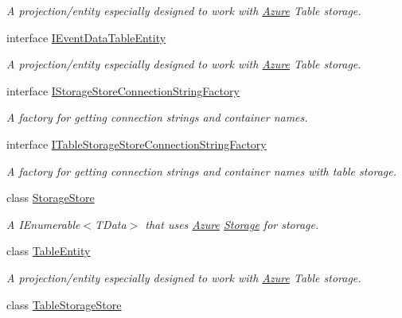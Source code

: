\begin{DoxyCompactItemize}
\begin{DoxyCompactList}\small\item\em A projection/entity especially designed to work with \hyperlink{namespaceCqrs_1_1Azure}{Azure} Table storage. \end{DoxyCompactList}\item 
interface \hyperlink{interfaceCqrs_1_1Azure_1_1BlobStorage_1_1IEventDataTableEntity}{I\+Event\+Data\+Table\+Entity}
\begin{DoxyCompactList}\small\item\em A projection/entity especially designed to work with \hyperlink{namespaceCqrs_1_1Azure}{Azure} Table storage. \end{DoxyCompactList}\item 
interface \hyperlink{interfaceCqrs_1_1Azure_1_1BlobStorage_1_1IStorageStoreConnectionStringFactory}{I\+Storage\+Store\+Connection\+String\+Factory}
\begin{DoxyCompactList}\small\item\em A factory for getting connection strings and container names. \end{DoxyCompactList}\item 
interface \hyperlink{interfaceCqrs_1_1Azure_1_1BlobStorage_1_1ITableStorageStoreConnectionStringFactory}{I\+Table\+Storage\+Store\+Connection\+String\+Factory}
\begin{DoxyCompactList}\small\item\em A factory for getting connection strings and container names with table storage. \end{DoxyCompactList}\item 
class \hyperlink{classCqrs_1_1Azure_1_1BlobStorage_1_1StorageStore}{Storage\+Store}
\begin{DoxyCompactList}\small\item\em A I\+Enumerable$<$\+T\+Data$>$ that uses \hyperlink{namespaceCqrs_1_1Azure}{Azure} \hyperlink{namespaceCqrs_1_1Azure_1_1Storage}{Storage} for storage. \end{DoxyCompactList}\item 
class \hyperlink{classCqrs_1_1Azure_1_1BlobStorage_1_1TableEntity}{Table\+Entity}
\begin{DoxyCompactList}\small\item\em A projection/entity especially designed to work with \hyperlink{namespaceCqrs_1_1Azure}{Azure} Table storage. \end{DoxyCompactList}\item 
class \hyperlink{classCqrs_1_1Azure_1_1BlobStorage_1_1TableStorageStore}{Table\+Storage\+Store}

\end{DoxyCompactItemize}
